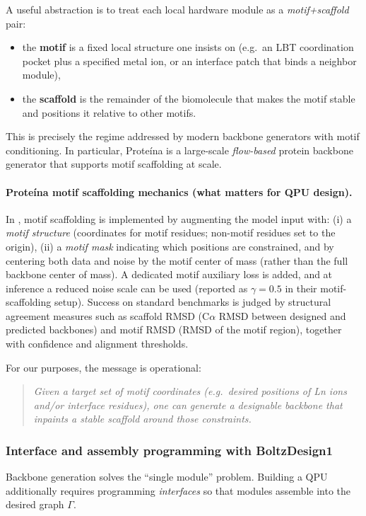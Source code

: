 \documentclass[11pt,oneside]{amsbook}
\numberwithin{equation}{section}
\theoremstyle{plain}
\theoremstyle{definition}
\theoremstyle{remark}
\begin{document}
A useful abstraction is to treat each local hardware module as a \emph{motif+scaffold} pair:
\begin{itemize}
\item the \textbf{motif} is a fixed local structure one insists on (e.g.\ an LBT coordination pocket plus a specified metal ion, or an interface patch that binds a neighbor module),
\item the \textbf{scaffold} is the remainder of the biomolecule that makes the motif stable and positions it relative to other motifs.
\end{itemize}

This is precisely the regime addressed by modern backbone generators with motif conditioning.
In particular, Prote\'{i}na \cite{Geffner2025Proteina} is a large-scale \emph{flow-based} protein backbone generator that supports motif scaffolding at scale.

\paragraph{Prote\'{i}na motif scaffolding mechanics (what matters for QPU design).}
In \cite{Geffner2025Proteina}, motif scaffolding is implemented by augmenting the model input with:
(i) a \emph{motif structure} (coordinates for motif residues; non-motif residues set to the origin),
(ii) a \emph{motif mask} indicating which positions are constrained,
and by centering both data and noise by the motif center of mass (rather than the full backbone center of mass).
A dedicated motif auxiliary loss is added, and at inference a reduced noise scale can be used (reported as $\gamma=0.5$ in their motif-scaffolding setup).
Success on standard benchmarks is judged by structural agreement measures such as scaffold RMSD (C$\alpha$ RMSD between designed and predicted backbones)
and motif RMSD (RMSD of the motif region), together with confidence and alignment thresholds.

For our purposes, the message is operational:
\begin{quote}
\emph{Given a target set of motif coordinates (e.g.\ desired positions of Ln ions and/or interface residues),
one can generate a \emph{designable} backbone that inpaints a stable scaffold around those constraints.}
\end{quote}

\subsubsection{Interface and assembly programming with BoltzDesign1}
Backbone generation solves the ``single module'' problem.
Building a QPU additionally requires programming \emph{interfaces} so that modules assemble into the desired graph $\Gamma$.
\end{document}
